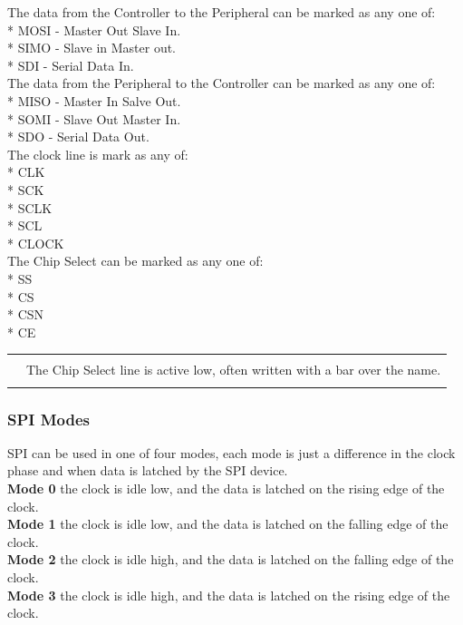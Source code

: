\documentclass{ol-softwaremanual}
\newcommand{\Note}[1]{
\begin{table}[h]
\begin{tabular}{|p{0.1\textwidth}p{0.8\textwidth}|}
\hline
 & \\
\multicolumn{1}{|r}{\Huge\warning} & #1\\
 &  \\ \hline
\end{tabular}
\end{table}
}
\begin{document}
\begin{ffcode}
The data from the Controller to the Peripheral can be marked as any one of:\\

* MOSI - Master Out Slave In.\\
* SIMO - Slave in Master out.\\
* SDI - Serial Data In.\\

The data from the Peripheral to the Controller can be marked as any one of:\\

* MISO - Master In Salve Out.\\
* SOMI - Slave Out Master In.\\
* SDO - Serial Data Out.\\

The clock line is mark as any of:\\

* CLK\\
* SCK\\
* SCLK\\
* SCL\\
* CLOCK\\

\pagebreak
The Chip Select can be marked as any one of:\\

* SS\\
* CS\\
* CSN\\
* CE\\

\Note{The Chip Select line is active low, often written with a bar over the name.}


\subsubsection{SPI Modes}
SPI can be used in one of four modes, each mode is just a difference in the clock phase and when data is latched by the SPI device.\\

\textbf{Mode 0} the clock is idle low, and the data is latched on the rising edge of the clock.\\
\textbf{Mode 1} the clock is idle low, and the data is latched on the falling edge of the clock.\\
\textbf{Mode 2} the clock is idle high, and the data is latched on the falling edge of the clock.\\
\textbf{Mode 3} the clock is idle high, and the data is latched on the rising edge of the clock.\\


\end{ffcode}
\end{document}
